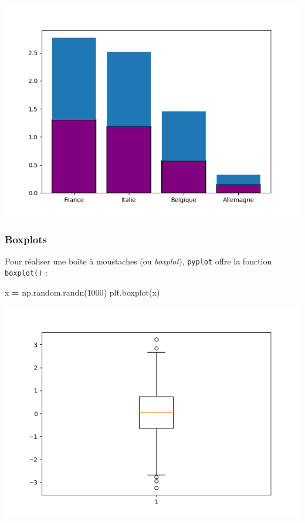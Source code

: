 \documentclass[12pt,]{book}
\newenvironment{Shaded}{\begin{snugshade}}{\end{snugshade}}
\newcommand{\DecValTok}[1]{\textcolor[rgb]{0.00,0.00,0.81}{#1}}
\newcommand{\OperatorTok}[1]{\textcolor[rgb]{0.81,0.36,0.00}{\textbf{#1}}}
\newcommand{\NormalTok}[1]{#1}
\numberwithin{equation}{section}
\numberwithin{countremarque}{section}
\begin{document}
\begin{center}\includegraphics[width=9.03in]{figs/pyplot/barplot_esthetiques} \end{center}

\subsubsection{Boxplots}\label{boxplots}

Pour réaliser une boîte à moustaches (ou \emph{boxplot}),
\texttt{pyplot} offre la fonction \texttt{boxplot()} :

\begin{Shaded}
\begin{Highlighting}[]
\NormalTok{x }\OperatorTok{=}\NormalTok{ np.random.randn(}\DecValTok{1000}\NormalTok{)}
\NormalTok{plt.boxplot(x)}
\end{Highlighting}
\end{Shaded}

\begin{center}\includegraphics[width=9.03in]{figs/pyplot/boxplot} \end{center}
\end{document}
